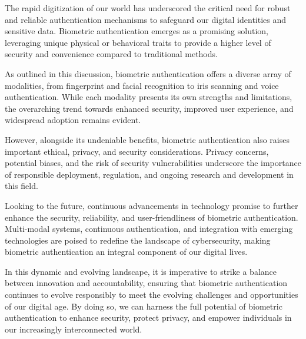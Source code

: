 \hspace{1 em}The rapid digitization of our world has underscored the critical need for robust and reliable authentication mechanisms to safeguard our digital identities and sensitive data. Biometric authentication emerges as a promising solution, leveraging unique physical or behavioral traits to provide a higher level of security and convenience compared to traditional methods.

As outlined in this discussion, biometric authentication offers a diverse array of modalities, from fingerprint and facial recognition to iris scanning and voice authentication. While each modality presents its own strengths and limitations, the overarching trend towards enhanced security, improved user experience, and widespread adoption remains evident.

However, alongside its undeniable benefits, biometric authentication also raises important ethical, privacy, and security considerations. Privacy concerns, potential biases, and the risk of security vulnerabilities underscore the importance of responsible deployment, regulation, and ongoing research and development in this field.

Looking to the future, continuous advancements in technology promise to further enhance the security, reliability, and user-friendliness of biometric authentication. Multi-modal systems, continuous authentication, and integration with emerging technologies are poised to redefine the landscape of cybersecurity, making biometric authentication an integral component of our digital lives.

In this dynamic and evolving landscape, it is imperative to strike a balance between innovation and accountability, ensuring that biometric authentication continues to evolve responsibly to meet the evolving challenges and opportunities of our digital age. By doing so, we can harness the full potential of biometric authentication to enhance security, protect privacy, and empower individuals in our increasingly interconnected world.